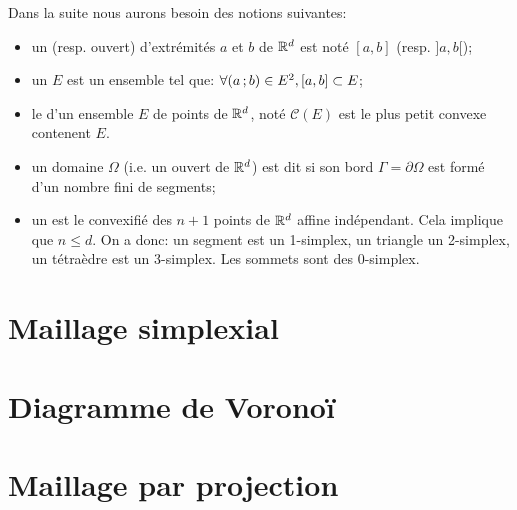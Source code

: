 \medskip
Dans la suite nous aurons besoin des notions suivantes:
\begin{itemize}
   \item un  (resp. ouvert) d'extrémités $a$ et $b$ de $\mathbb R^d$ est noté $[a,b]$ (resp. $]a,b[$);
   \item un  $E$ est un ensemble tel que: $\forall \mathopen{(}a\,;b\mathclose{)}\in E^2, [a,b]\subset E$;
   \item le  d'un ensemble $E$ de points de $\mathbb R^d$, noté $\mathcal{C}(E)$ est le plus petit convexe
	contenent $E$.
   \item un domaine $\Omega$ (i.e. un ouvert de $\mathbb R^d$) est dit  si son bord $\Gamma=\partial\Omega$
	est formé d'un nombre fini de segments;
   \item un  est le convexifié des $n+1$ points de $\mathbb R^d$ affine indépendant.
	Cela implique que $n\le d$. On a donc: un segment est un 1-simplex, un triangle un 2-simplex, un tétraèdre est un 3-simplex.
	Les sommets sont des 0-simplex.
\end{itemize}


\medskip
\section{Maillage simplexial}




\medskip
\section{Diagramme de Voronoï}



\medskip
\section{Maillage par projection}

